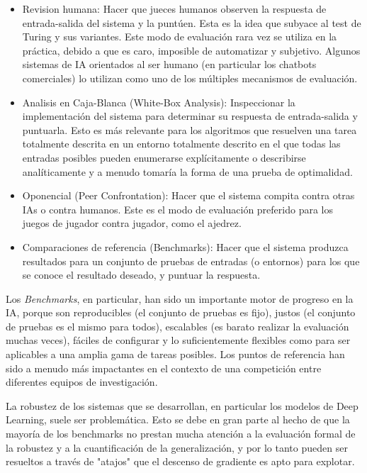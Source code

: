 \begin{itemize}
\item Revision humana: Hacer que jueces humanos observen la respuesta de entrada-salida del sistema y la puntúen. Esta es la idea que subyace al test de Turing y sus variantes. Este modo de evaluación rara vez se utiliza en la práctica, debido a que es caro, imposible de automatizar y subjetivo. Algunos sistemas de IA orientados al ser humano (en particular los chatbots comerciales) lo utilizan como uno de los múltiples mecanismos de evaluación.

\item Analisis en Caja-Blanca (White-Box Analysis): Inspeccionar la implementación del sistema para determinar su respuesta de entrada-salida y puntuarla. Esto es más relevante para los algoritmos que resuelven una tarea totalmente descrita en un entorno totalmente descrito en el que todas las entradas posibles pueden enumerarse explícitamente o describirse analíticamente y a menudo tomaría la forma de una prueba de optimalidad.

\item Oponencial (Peer Confrontation): Hacer que el sistema compita contra otras IAs o contra humanos. Este es el modo de evaluación preferido para los juegos de jugador contra jugador, como el ajedrez.

\item Comparaciones de referencia (Benchmarks): Hacer que el sistema produzca resultados para un conjunto de pruebas de entradas (o entornos) para los que se conoce el resultado deseado, y puntuar la respuesta.
\end{itemize}

Los \textit{Benchmarks}, en particular, han sido un importante motor de progreso en la IA, porque son reproducibles (el conjunto de pruebas es fijo), justos (el conjunto de pruebas es el mismo para todos), escalables (es barato realizar la evaluación muchas veces), fáciles de configurar y lo suficientemente flexibles como para ser aplicables a una amplia gama de tareas posibles. Los puntos de referencia han sido a menudo más impactantes en el contexto de una competición entre diferentes equipos de investigación.

La robustez de los sistemas que se desarrollan, en particular los modelos de Deep Learning, suele ser problemática. Esto se debe en gran parte al hecho de que la mayoría de los benchmarks no prestan mucha atención a la evaluación formal de la robustez y a la cuantificación de la generalización, y por lo tanto pueden ser resueltos a través de "atajos" que el descenso de gradiente es apto para explotar.

